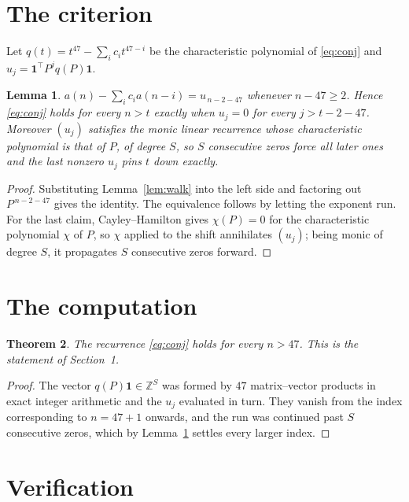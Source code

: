 \documentclass[11pt,a4paper]{article}
\theoremstyle{plain}
\newtheorem{theorem}{Theorem}
\newtheorem{lemma}[theorem]{Lemma}
\theoremstyle{definition}
\begin{document}
\section{The criterion}

Let $q(t)=t^{47}-\sum_i c_i t^{47-i}$ be the characteristic polynomial of
\eqref{eq:conj} and $u_j=\mathbf{1}^{\!\top}P^{j}q(P)\mathbf{1}$.

\begin{lemma}\label{lem:crit}
$a(n)-\sum_i c_i a(n-i)=u_{\,n-2-47}$ whenever $n-47\ge2$. Hence
\eqref{eq:conj} holds for every $n>t$ exactly when $u_j=0$ for every
$j>t-2-47$. Moreover $(u_j)$ satisfies the monic linear recurrence whose
characteristic polynomial is that of $P$, of degree $S$, so $S$ consecutive zeros force all
later ones and the last nonzero $u_j$ pins $t$ down exactly.
\end{lemma}

\begin{proof}
Substituting Lemma~\ref{lem:walk} into the left side and factoring out
$P^{\,n-2-47}$ gives the identity. The equivalence follows by letting the exponent
run. For the last claim, Cayley--Hamilton gives $\chi(P)=0$ for the characteristic
polynomial $\chi$ of $P$, so $\chi$ applied to the shift annihilates $(u_j)$; being monic of
degree $S$, it propagates $S$ consecutive zeros forward.
\end{proof}

\section{The computation}

\begin{theorem}
The recurrence \eqref{eq:conj} holds for every $n>47$. This is the statement of
Section~1.
\end{theorem}

\begin{proof}
The vector $q(P)\mathbf{1}\in\mathbb{Z}^{S}$ was formed by $47$ matrix--vector
products in exact integer arithmetic and the $u_j$ evaluated in turn. They vanish from the
index corresponding to $n=47+1$ onwards, and the run was continued past $S$ consecutive
zeros, which by Lemma~\ref{lem:crit} settles every larger index.
\end{proof}

\section{Verification}
\end{document}
